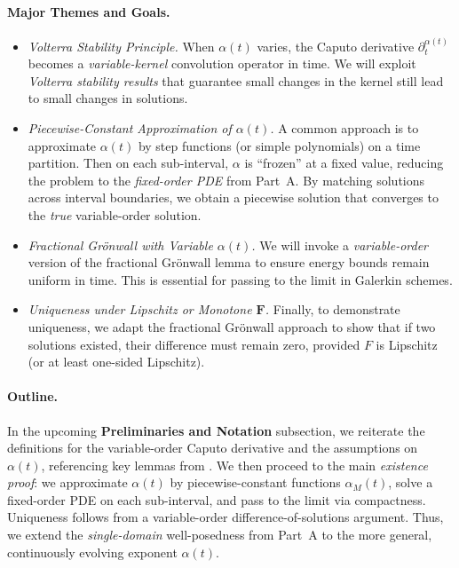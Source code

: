 \documentclass[12pt]{article}
\begin{document}
\paragraph{Major Themes and Goals.}
\begin{itemize}
    \item \emph{Volterra Stability Principle.} When $\alpha(t)$ varies,
          the Caputo derivative $\partial_t^{\alpha(t)}$ becomes a \emph{variable-kernel}
          convolution operator in time. We will exploit \emph{Volterra stability results}
          that guarantee small changes in the kernel still lead to small changes in
          solutions.
    \item \emph{Piecewise-Constant Approximation of \(\alpha(t)\).} A common approach is
          to approximate $\alpha(t)$ by step functions (or simple polynomials) on a time
          partition. Then on each sub-interval, $\alpha$ is ``frozen'' at a fixed value,
          reducing the problem to the \emph{fixed-order PDE} from Part~A. By matching
          solutions across interval boundaries, we obtain a piecewise solution that
          converges to the \emph{true} variable-order solution.
    \item \emph{Fractional Grönwall with Variable \(\alpha(t)\).} We will invoke a
          \emph{variable-order} version of the fractional Grönwall lemma to ensure
          energy bounds remain uniform in time. This is essential for passing to the
          limit in Galerkin schemes.
    \item \emph{Uniqueness under Lipschitz or Monotone \(\mathbf{F}\).} Finally, to
          demonstrate uniqueness, we adapt the fractional Grönwall approach to show that
          if two solutions existed, their difference must remain zero, provided $F$ is
          Lipschitz (or at least one-sided Lipschitz).
\end{itemize}

\paragraph{Outline.}
In the upcoming \textbf{Preliminaries and Notation} subsection, we reiterate the definitions
for the variable-order Caputo derivative and the assumptions on $\alpha(t)$, referencing
key lemmas from \cite{Sun2019,Ye2007}. We then proceed to the main \emph{existence proof}:
we approximate $\alpha(t)$ by piecewise-constant functions $\alpha_M(t)$, solve a
fixed-order PDE on each sub-interval, and pass to the limit via compactness. Uniqueness
follows from a variable-order difference-of-solutions argument. Thus, we extend the
\emph{single-domain} well-posedness from Part~A to the more general, continuously evolving
exponent $\alpha(t)$.
\end{document}
